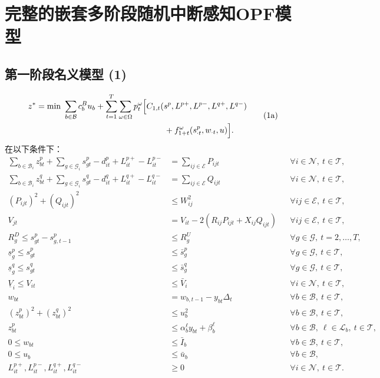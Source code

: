 \documentclass[10pt]{article}
\begin{document}
\section*{完整的嵌套多阶段随机中断感知OPF模型}
\subsection*{第一阶段名义模型 (1)}
\begin{equation}
\begin{aligned}
z^*=\min\ &\sum_{b\in\mathcal B}c_b^B u_b+\sum_{t=1}^{T}\sum_{\omega\in\Omega}p_t^\omega\Bigl[C_{1,t}(s^p,L^{p+},L^{p-},L^{q+},L^{q-})\\
&\hspace{43mm}+f_{1+t}^\omega(s_{\cdot t}^p,w_{\cdot t},u)\Bigr].
\end{aligned}\tag{1a}
\end{equation}
在以下条件下：
\begin{align}
\sum_{b\in\mathcal B_i}z_{bt}^p+\sum_{g\in\mathcal G_i}s_{gt}^p-d_{it}^p+L_{it}^{p+}-L_{it}^{p-}&=\sum_{ij\in\mathcal E}P_{ijt} &&\forall i\in\mathcal N,\ t\in\mathcal T, \tag{1b}\\
\sum_{b\in\mathcal B_i}z_{bt}^q+\sum_{g\in\mathcal G_i}s_{gt}^q-d_{it}^q+L_{it}^{q+}-L_{it}^{q-}&=\sum_{ij\in\mathcal E}Q_{ijt} &&\forall i\in\mathcal N,\ t\in\mathcal T, \tag{1c}\\
(P_{ijt})^2+(Q_{ijt})^2&\leq W_{ij}^2 &&\forall ij\in\mathcal E,\ t\in\mathcal T, \tag{1d}\\
V_{jt}&=V_{it}-2(R_{ij}P_{ijt}+X_{ij}Q_{ijt}) &&\forall ij\in\mathcal E,\ t\in\mathcal T, \tag{1e}\\
R_g^D\leq s_{gt}^p-s_{g,t-1}^p&\leq R_g^U &&\forall g\in\mathcal G,\ t=2,\ldots,T, \tag{1f}\\
\underline{s}_g^p\leq s_{gt}^p&\leq\bar{s}_g^p &&\forall g\in\mathcal G,\ t\in\mathcal T, \tag{1g}\\
\underline{s}_g^q\leq s_{gt}^q&\leq\bar{s}_g^q &&\forall g\in\mathcal G,\ t\in\mathcal T, \tag{1h}\\
\underline V_i\leq V_{it}&\leq\bar V_i &&\forall i\in\mathcal N,\ t\in\mathcal T, \tag{1i}\\
w_{bt}&=w_{b,t-1}-y_{bt}\Delta_t &&\forall b\in\mathcal B,\ t\in\mathcal T, \tag{1j}\\
(z_{bt}^p)^2+(z_{bt}^q)^2&\leq u_b^2 &&\forall b\in\mathcal B,\ t\in\mathcal T, \tag{1k}\\
z_{bt}^p&\leq\alpha_b^\ell y_{bt}+\beta_b^\ell &&\forall b\in\mathcal B,\ \ell\in\mathcal L_b,\ t\in\mathcal T, \tag{1l}\\
0\leq w_{bt}&\leq\bar I_b &&\forall b\in\mathcal B,\ t\in\mathcal T, \tag{1m}\\
0\leq u_b&\leq\bar u_b &&\forall b\in\mathcal B, \tag{1n}\\
L_{it}^{p+},L_{it}^{p-},L_{it}^{q+},L_{it}^{q-}&\geq0 &&\forall i\in\mathcal N,\ t\in\mathcal T. \tag{1o}
\end{align}
\end{document}

